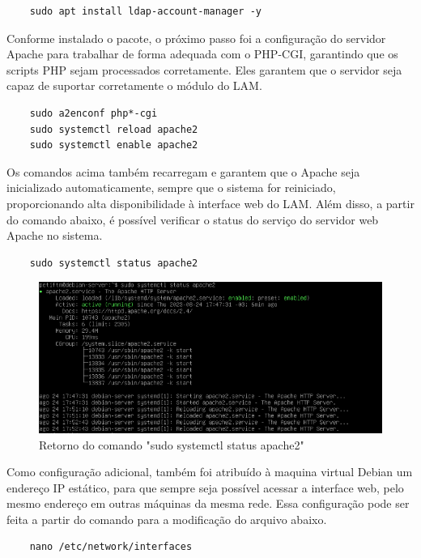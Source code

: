 \begin{lstlisting}
    sudo apt install ldap-account-manager -y
\end{lstlisting}

Conforme instalado o pacote, o próximo passo foi a configuração do servidor Apache para trabalhar de forma adequada com o PHP-CGI, garantindo que os scripts PHP sejam processados corretamente. Eles garantem que o servidor seja capaz de suportar corretamente o módulo do LAM.

\begin{lstlisting}
    sudo a2enconf php*-cgi
    sudo systemctl reload apache2
    sudo systemctl enable apache2
\end{lstlisting}

Os comandos acima também recarregam e garantem que o Apache seja inicializado automaticamente, sempre que o sistema for reiniciado, proporcionando alta disponibilidade à interface web do LAM. Além disso, a partir do comando abaixo, é possível verificar o status do serviço do servidor web Apache no sistema.

\begin{lstlisting}
    sudo systemctl status apache2
\end{lstlisting}

\begin{figure}[h]
	\centering
	\includegraphics[scale=0.7]{textuais/codigo5.png}
	\caption{Retorno do comando "sudo systemctl status apache2"
	\label{fig:status}}
\end{figure}

Como configuração adicional, também foi atribuído à maquina virtual Debian um endereço IP estático, para que sempre seja possível acessar a interface web, pelo mesmo endereço em outras máquinas da mesma rede. Essa configuração pode ser feita a partir do comando para a modificação do arquivo abaixo.

\begin{lstlisting}
    nano /etc/network/interfaces
\end{lstlisting}

